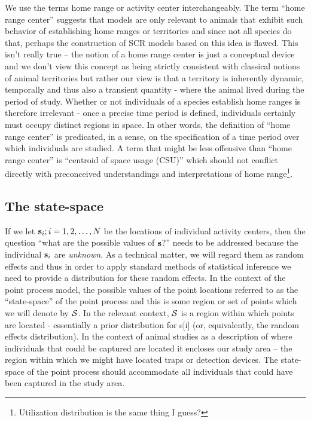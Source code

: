 We use the terms home range or activity center interchangeably. The
term ``home range center'' suggests that models are only relevant to
animals that exhibit such behavior of establishing home ranges or
territories and since not all species do that, perhaps the
construction of SCR models based on this idea is flawed. This isn't
really true -- the notion of a home range center is just a conceptual
device and we don't view this concept as being strictly consistent
with classical notions of animal territories but rather our view is
that a territory is inherently dynamic, temporally and thus also a
transient quantity - where the animal lived during the period of
study.  Whether or not individuals of a species establish home ranges
is therefore irrelevant - once a precise time period is defined,
individuals certainly must occupy distinct regions in space. In other
words, the definition of ``home range center'' is predicated, in a
sense, on the specification of a time period over which individuals
are studied. A term that might be less offensive than ``home range
center'' is ``centroid of space usage (CSU)'' which should not
conflict directly with preconceived understandings and interpretations
of home range\footnote{Utilization distribution is the same thing
  I guess?}.


\subsection{The state-space}

If we let ${\bf s}_{i}; i=1,2,\ldots,N$ be the locations of individual
activity centers, then the question ``what are the possible values of
${\bf s}$?'' needs to be addressed because the individual ${\bf
  s}_{i}$ are {\it unknown}. As a technical matter, we will regard
them as random effects and thus in order to apply standard methods of
statistical inference we need to provide a distribution for these
random effects.  In the context of the point process model, the
possible values of the point locations referred to as the
``state-space'' of the point process and this is some region or set of
points which we will denote by ${\cal S}$. In the relevant context,
${\cal S}$ is a region within which points are located - essentially a
prior distribution for s[i] (or, equivalently, the random effects
distribution). In the context of animal studies as a description of
where individuals that could be captured are located it encloses our
study area -- the region within which we might have located traps or
detection devices.  The state-space of the point process should
accommodate all individuals that could have been captured in the study
area.

